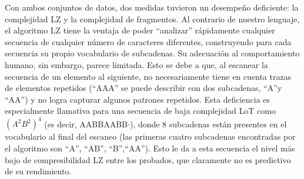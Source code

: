 
Con ambos conjuntos de datos, dos medidas tuvieron un desempeño deficiente: la complejidad LZ y la complejidad de fragmentos. Al contrario de nuestro lenguaje, el algoritmo LZ tiene la ventaja de poder ``analizar'' rápidamente cualquier secuencia de cualquier número de caracteres diferentes, construyendo para cada secuencia su propio vocabulario de subcadenas. Su adecuación al comportamiento humano, sin embargo, parece limitada. Esto se debe a que, al escanear la secuencia de un elemento al siguiente, no necesariamente tiene en cuenta trazas de elementos repetidos (``AAA'' se puede describir con dos subcadenas, ``A''y ``AA'') y no logra capturar algunos patrones repetidos. Esta deficiencia es especialmente llamativa para una secuencia de baja complejidad LoT como $(A^2B^2)^4$ (es decir, AABBAABB$\cdot$), donde 8 subcadenas están presentes en el vocabulario al final del escaneo (las primeras cuatro subcadenas encontradas por el algoritmo son ``A'', ``AB'', ``B'',``AA''). Esto le da a esta secuencia el nivel más bajo de compresibilidad LZ entre los probados, que claramente no es predictivo de su rendimiento.


